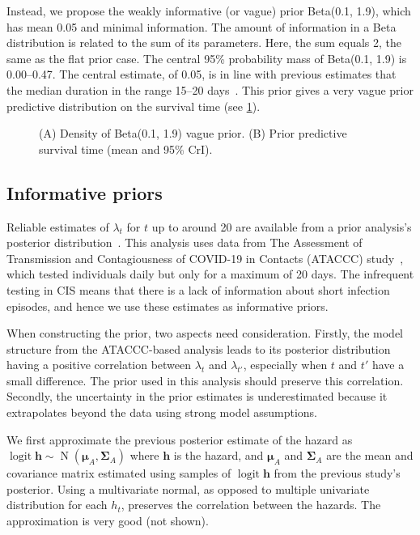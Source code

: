 \documentclass[12pt]{article}
\def\dist{\sim}
\DeclareMathOperator{\logit}{logit}
\DeclareMathOperator{\MNorm}{N}
\newcommand\matr{\bm}
\renewcommand{\vec}[1]{\bm{#1}}
\begin{document}
Instead, we propose the weakly informative (or vague) prior Beta(0.1, 1.9), which has mean 0.05 and minimal information.
The amount of information in a Beta distribution is related to the sum of its parameters.
Here, the sum equals 2, the same as the flat prior case.
The central 95\% probability mass of Beta(0.1, 1.9) is 0.00--0.47.
The central estimate, of 0.05, is in line with previous estimates that the median duration in the range 15--20 days~\citep{cevikShedding}.
This prior gives a very vague prior predictive distribution on the survival time (see \cref{perf-test:fig:vague-prior}).
\begin{figure}
  \caption[Vague prior for the hazard]{
    (A) Density of Beta(0.1, 1.9) vague prior.
    (B) Prior predictive survival time (mean and 95\% CrI).
  }
  \label{perf-test:fig:vague-prior}
\end{figure}

\subsection{Informative priors} \label{sec:informative-prior}

Reliable estimates of $\lambda_t$ for $t$ up to around 20 are available from a prior analysis's posterior distribution~\citep{blakeThesis}.
This analysis uses data from The Assessment of Transmission and Contagiousness of COVID-19 in Contacts (ATACCC) study~\citep{hakkiOnset}, which tested individuals daily but only for a maximum of 20 days.
The infrequent testing in CIS means that there is a lack of information about short infection episodes, and hence we use these estimates as informative priors.

When constructing the prior, two aspects need consideration.
Firstly, the model structure from the ATACCC-based analysis leads to its posterior distribution having a positive correlation between $\lambda_t$ and $\lambda_{t'}$, especially when $t$ and $t'$ have a small difference.
The prior used in this analysis should preserve this correlation.
Secondly, the uncertainty in the prior estimates is underestimated because it extrapolates beyond the data using strong model assumptions.

We first approximate the previous posterior estimate of the hazard as $\logit{\vec{h}} \dist \MNorm(\vec{\mu}_A, \matr{\Sigma}_A)$ where $\vec{h}$ is the hazard, and $\vec{\mu}_A$ and $\matr{\Sigma}_A$ are the mean and covariance matrix estimated using samples of $\logit{\vec{h}}$ from the previous study's posterior.
Using a multivariate normal, as opposed to multiple univariate distribution for each $h_t$, preserves the correlation between the hazards.
The approximation is very good (not shown).
\end{document}
